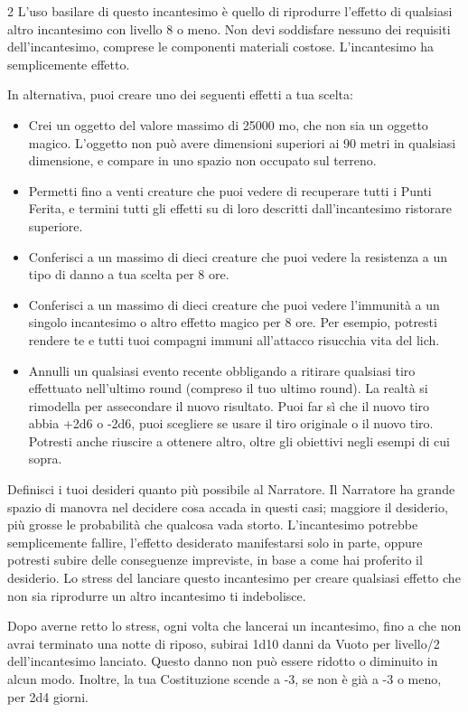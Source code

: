 \begin{multicols}{2}
L'uso basilare di questo incantesimo è quello di riprodurre l'effetto di qualsiasi altro incantesimo con livello 8 o meno. Non devi soddisfare nessuno dei requisiti dell'incantesimo, comprese le componenti materiali costose. L'incantesimo ha semplicemente effetto.

In alternativa, puoi creare uno dei seguenti effetti a tua scelta:

\begin{itemize}[leftmargin=*] \setlength{\itemsep}{0pt}
	\item Crei un oggetto del valore massimo di 25000 mo, che non sia un oggetto magico. L'oggetto non può avere dimensioni superiori ai 90 metri in qualsiasi dimensione, e compare in uno spazio non occupato sul terreno.
	\item Permetti fino a venti creature che puoi vedere di recuperare tutti i Punti Ferita, e termini tutti gli effetti su di loro descritti dall'incantesimo ristorare superiore.
	\item Conferisci a un massimo di dieci creature che puoi vedere la resistenza a un tipo di danno a tua scelta per 8 ore.
	\item Conferisci a un massimo di dieci creature che puoi vedere l'immunità a un singolo incantesimo o altro effetto magico per 8 ore. Per esempio, potresti rendere te e tutti tuoi compagni immuni all'attacco risucchia vita del lich.
	\item Annulli un qualsiasi evento recente obbligando a ritirare qualsiasi tiro effettuato nell'ultimo round (compreso il tuo ultimo round). La realtà si rimodella per assecondare il nuovo risultato. Puoi far sì che il nuovo tiro abbia +2d6 o -2d6, puoi scegliere se usare il tiro originale o il nuovo tiro. Potresti anche riuscire a ottenere altro, oltre gli obiettivi negli esempi di cui sopra.
\end{itemize}

\medskip
Definisci i tuoi desideri quanto più possibile al Narratore. Il Narratore ha grande spazio di manovra nel decidere cosa accada in questi casi; maggiore il desiderio, più grosse le probabilità che qualcosa vada storto. L'incantesimo potrebbe semplicemente fallire, l'effetto desiderato manifestarsi solo in parte, oppure potresti subire delle conseguenze impreviste, in base a come hai proferito il desiderio. Lo stress del lanciare questo incantesimo per creare qualsiasi effetto che non sia riprodurre un altro incantesimo ti indebolisce.

Dopo averne retto lo stress, ogni volta che lancerai un incantesimo, fino a che non avrai terminato una notte di riposo, subirai 1d10 danni da Vuoto per livello/2 dell'incantesimo lanciato. Questo danno non può essere ridotto o diminuito in alcun modo. Inoltre, la tua Costituzione scende a -3, se non è già a -3 o meno, per 2d4 giorni.


\end{multicols}
